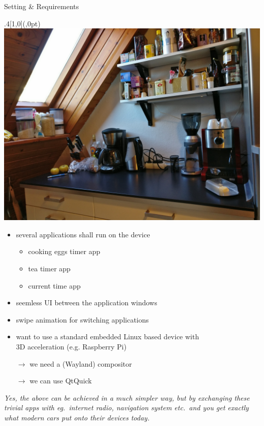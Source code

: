 \documentclass[ucs,9pt]{beamer}
\begin{document}
\begin{frame}
    {Setting \& Requirements}

    \begin{textblock*}{.4\paperwidth}[1,0](\paperwidth,0pt)%
        \includegraphics[width=\linewidth]{kitchen-right.jpg}
    \end{textblock*}%

    \begin{itemize}
        \item several applications shall run on the device
            \begin{itemize}
                \item cooking eggs timer app
                \item tea timer app
                \item current time app
            \end{itemize}
        \item seemless UI between the application windows
        \item swipe animation for switching applications
        \item want to use a standard embedded Linux based device with\\
            3D acceleration (e.g. Raspberry Pi)
    \end{itemize}

    \begin{itemize}
        \item [$\rightarrow$] we need a (Wayland) compositor
        \item [$\rightarrow$] we can use QtQuick
    \end{itemize}
    \vfill

    \emph{Yes, the above can be achieved in a much simpler way, but by exchanging these trivial apps with eg.\ internet radio, navigation system etc.\ and you get exactly what modern cars put onto their devices today.}
\end{frame}
\end{document}

